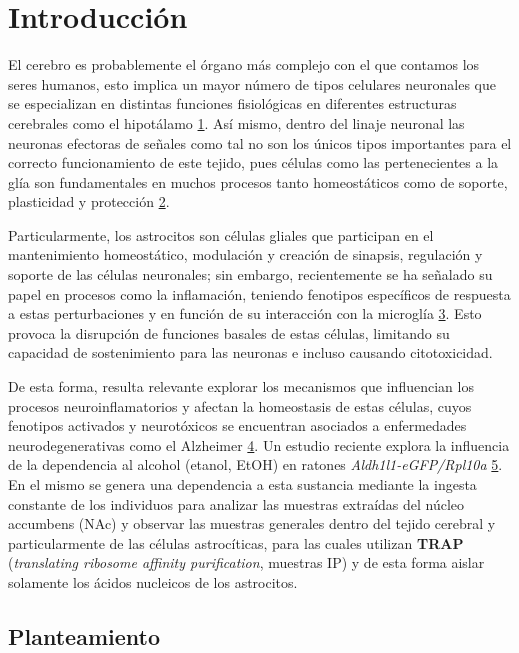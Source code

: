 \documentclass[
  10pt,
]{article}
\begin{document}
\section{Introducción}\label{introducciuxf3n}

El cerebro es probablemente el órgano más complejo con el que contamos
los seres humanos, esto implica un mayor número de tipos celulares
neuronales que se especializan en distintas funciones fisiológicas en
diferentes estructuras cerebrales como el hipotálamo
\hyperref[section]{1}. Así mismo, dentro del linaje neuronal las
neuronas efectoras de señales como tal no son los únicos tipos
importantes para el correcto funcionamiento de este tejido, pues células
como las pertenecientes a la glía son fundamentales en muchos procesos
tanto homeostáticos como de soporte, plasticidad y protección
\hyperref[section-1]{2}.

Particularmente, los astrocitos son células gliales que participan en el
mantenimiento homeostático, modulación y creación de sinapsis,
regulación y soporte de las células neuronales; sin embargo,
recientemente se ha señalado su papel en procesos como la inflamación,
teniendo fenotipos específicos de respuesta a estas perturbaciones y en
función de su interacción con la microglía \hyperref[section-2]{3}. Esto
provoca la disrupción de funciones basales de estas células, limitando
su capacidad de sostenimiento para las neuronas e incluso causando
citotoxicidad.

De esta forma, resulta relevante explorar los mecanismos que influencian
los procesos neuroinflamatorios y afectan la homeostasis de estas
células, cuyos fenotipos activados y neurotóxicos se encuentran
asociados a enfermedades neurodegenerativas como el Alzheimer
\hyperref[section-3]{4}. Un estudio reciente explora la influencia de la
dependencia al alcohol (etanol, EtOH) en ratones
\emph{Aldh1l1-eGFP/Rpl10a} \hyperref[section-4]{5}. En el mismo se
genera una dependencia a esta sustancia mediante la ingesta constante de
los individuos para analizar las muestras extraídas del núcleo accumbens
(NAc) y observar las muestras generales dentro del tejido cerebral y
particularmente de las células astrocíticas, para las cuales utilizan
\textbf{TRAP} (\emph{translating ribosome affinity purification},
muestras IP) y de esta forma aislar solamente los ácidos nucleicos de
los astrocitos.

\subsection{Planteamiento}\label{planteamiento}
\end{document}
